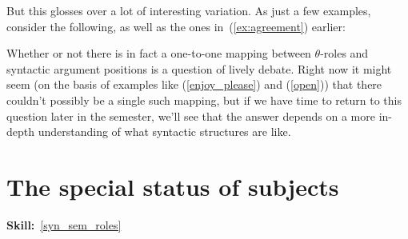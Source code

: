 \documentclass{article}
\begin{document}
But this glosses over a lot of interesting variation.
As just a few examples, consider the following, as well as the ones in~(\ref{ex:agreement}) earlier:        

\begin{exe}
    \label{enjoy_please}
    \label{open}
\end{exe}

Whether or not there is in fact a one-to-one mapping between $\theta$-roles and syntactic argument positions is a question of lively debate.
Right now it might seem (on the basis of examples like (\ref{enjoy_please}) and (\ref{open})) that there couldn't possibly be a single such mapping, but if we have time to return to this question later in the semester, we'll see that the answer depends on a more in-depth understanding of what syntactic structures are like.

\section{The special status of subjects}
\hfill{}\textbf{Skill:}~\ref{syn_sem_roles}
\end{document}
